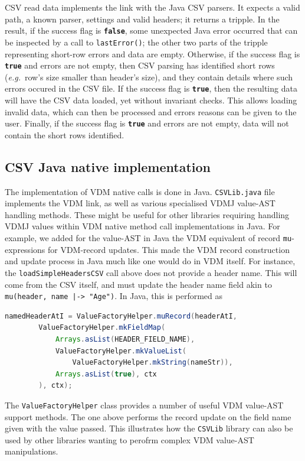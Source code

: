 \documentclass[runningheads,a4paper]{llncs}
\begin{document}
CSV read data implements the link with the Java CSV parsers. It expects a valid path, a known parser, settings and valid headers; it returns a tripple. In the result, if the success flag is \texttt{\textbf{false}}, some unexpected Java error occurred that can be inspected by a call to \texttt{lastError()}; the other two parts of the tripple representing short-row errors and data are empty. Otherwise, if the success flag is \texttt{\textbf{true}} and errors are not empty, then CSV parsing has identified short rows (\textit{e.g.}~row's size smaller than header's size), and they contain details where such errors occured in the CSV file. If the success flag is \texttt{\textbf{true}}, then the resulting data will have the CSV data loaded, yet without invariant checks. This allows loading invalid data, which can then be processed and errors reasons can be given to the user. Finally, if the success flag is \texttt{\textbf{true}} and errors are not empty, data will not contain the short rows identified.        

\subsection*{CSV Java native implementation}\label{subsec:JavaNative}

The implementation of VDM native calls is done in Java. \texttt{CSVLib.java} file implements the VDM link, as well as various specialised VDMJ value-AST handling methods. These might be useful for other libraries requiring handling VDMJ values within VDM native method call implementations in Java. For example, we added for the value-AST in Java the VDM equivalent of record \texttt{mu}-expressions for VDM-record updates. This made the VDM record construction and update process in Java much like one would do in VDM itself. For instance, the \texttt{loadSimpleHeadersCSV} call above does not provide a header name. This will come from the CSV itself, and must update the header name field akin to \texttt{mu(header, name |-> "Age")}. In Java, this is performed as 
%
\begin{lstlisting}[language=Java,basicstyle=\footnotesize\ttfamily]
    namedHeaderAtI = ValueFactoryHelper.muRecord(headerAtI, 
        ValueFactoryHelper.mkFieldMap(
            Arrays.asList(HEADER_FIELD_NAME), 
            ValueFactoryHelper.mkValueList(
                ValueFactoryHelper.mkString(nameStr)), 
            Arrays.asList(true), ctx
        ), ctx);
\end{lstlisting}
%
\noindent The \texttt{ValueFactoryHelper} class provides a number of useful VDM value-AST support methods. The one above performs the record update on the field name given with the value passed. This illustrates how the \texttt{CSVLib} library can also be used by other libraries wanting to perofrm complex VDM value-AST manipulations. 
\end{document}
